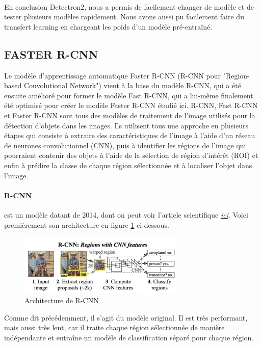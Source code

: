 \paragraph{}
En conclusion Detectron2, nous a permis de facilement changer de modèle et de tester plusieurs modèles rapidement. Nous avons aussi pu facilement faire du transfert learning en chargeant les poids d'un modèle pré-entraîné. 


\subsection{FASTER R-CNN}

Le modèle d'apprentissage automatique Faster R-CNN (R-CNN pour "Region-based Convolutional Network") vient à la base du modèle R-CNN, qui a été ensuite amélioré pour former le modèle Fast R-CNN, qui a lui-même finalement été optimisé pour créer le modèle Faster R-CNN étudié ici. R-CNN, Fast R-CNN et Faster R-CNN sont tous des modèles de traitement de l'image utilisés pour la détection d'objets dans les images. Ils utilisent tous une approche en plusieurs étapes qui consiste à extraire des caractéristiques de l'image à l'aide d'un réseau de neurones convolutionnel (CNN), puis à identifier les régions de l'image qui pourraient contenir des objets à l'aide de la sélection de région d'intérêt (ROI) et enfin à prédire la classe de chaque région sélectionnée et à localiser l'objet dans l'image.

\paragraph{R-CNN} est un modèle datant de 2014, dont on peut voir l'article scientifique \href{https://arxiv.org/pdf/1311.2524.pdf}{\textit{ici}}. Voici premièrement son architecture en figure \ref{fig:rcnn_architecture} ci-dessous.

\begin{figure}[H]
    \centering
    \includegraphics[width=300px]{images/model_rcnn_architecture.png}
    \caption{Architecture de R-CNN}
    \label{fig:rcnn_architecture}
\end{figure}

Comme dit précédemment, il s'agit du modèle original. Il est très performant, mais aussi très lent, car il traite chaque région sélectionnée de manière indépendante et entraîne un modèle de classification séparé pour chaque région.

